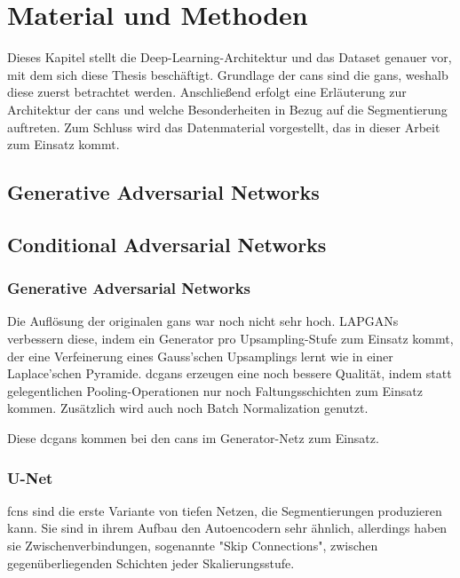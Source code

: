 \chapter{Material und Methoden}

Dieses Kapitel stellt die Deep-Learning-Architektur und das Dataset genauer vor, mit dem sich diese Thesis beschäftigt.
Grundlage der \glspl{can} sind die \glspl{gan}, weshalb diese zuerst betrachtet werden.
Anschließend erfolgt eine Erläuterung zur Architektur der \glspl{can} und welche Besonderheiten in Bezug auf die Segmentierung auftreten.
Zum Schluss wird das Datenmaterial vorgestellt, das in dieser Arbeit zum Einsatz kommt.



\section{Generative Adversarial Networks}





\section{Conditional Adversarial Networks}

\subsection{Generative Adversarial Networks}

Die Auflösung der originalen \glspl{gan} war noch nicht sehr hoch.
LAPGANs verbessern diese, indem ein Generator pro Upsampling-Stufe zum Einsatz kommt, der eine Verfeinerung eines Gauss'schen Upsamplings lernt wie in einer Laplace'schen Pyramide.
\glspl{dcgan} erzeugen eine noch bessere Qualität, indem statt gelegentlichen Pooling-Operationen nur noch Faltungsschichten zum Einsatz kommen.
Zusätzlich wird auch noch Batch Normalization genutzt.

Diese \glspl{dcgan} kommen bei den \glspl{can} im Generator-Netz zum Einsatz.

\subsection{U-Net}

\glspl{fcn} sind die erste Variante von tiefen Netzen, die Segmentierungen produzieren kann.
Sie sind in ihrem Aufbau den Autoencodern sehr ähnlich, allerdings haben sie Zwischenverbindungen, sogenannte "Skip Connections", zwischen gegenüberliegenden Schichten jeder Skalierungsstufe.

